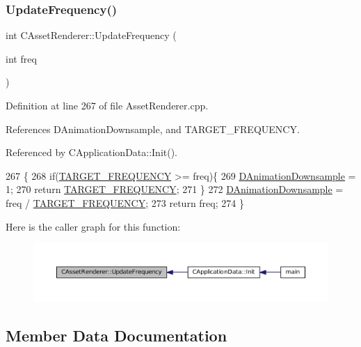 \subsubsection{\texorpdfstring{Update\+Frequency()}{UpdateFrequency()}}
{\footnotesize\ttfamily int C\+Asset\+Renderer\+::\+Update\+Frequency (\begin{DoxyParamCaption}\item[{int}]{freq }\end{DoxyParamCaption})\hspace{0.3cm}{\ttfamily [static]}}



Definition at line 267 of file Asset\+Renderer.\+cpp.



References D\+Animation\+Downsample, and T\+A\+R\+G\+E\+T\+\_\+\+F\+R\+E\+Q\+U\+E\+N\+CY.



Referenced by C\+Application\+Data\+::\+Init().


\begin{DoxyCode}
267                                            \{
268     \textcolor{keywordflow}{if}(\hyperlink{AssetRenderer_8cpp_a0d86e657ae1200c5ec796a3f31e36d49}{TARGET\_FREQUENCY} >= freq)\{
269         \hyperlink{classCAssetRenderer_a13ea9a19837c39e57db499f53366c5b8}{DAnimationDownsample} = 1;
270         \textcolor{keywordflow}{return} \hyperlink{AssetRenderer_8cpp_a0d86e657ae1200c5ec796a3f31e36d49}{TARGET\_FREQUENCY};   
271     \}
272     \hyperlink{classCAssetRenderer_a13ea9a19837c39e57db499f53366c5b8}{DAnimationDownsample} = freq / \hyperlink{AssetRenderer_8cpp_a0d86e657ae1200c5ec796a3f31e36d49}{TARGET\_FREQUENCY};
273     \textcolor{keywordflow}{return} freq;
274 \}
\end{DoxyCode}
Here is the caller graph for this function\+:\nopagebreak
\begin{figure}[H]
\begin{center}
\leavevmode
\includegraphics[width=350pt]{classCAssetRenderer_a06e45891dcbc0a88570c537a4d6906c8_icgraph}
\end{center}
\end{figure}


\subsection{Member Data Documentation}
\hypertarget{classCAssetRenderer_a13ea9a19837c39e57db499f53366c5b8}{}\label{classCAssetRenderer_a13ea9a19837c39e57db499f53366c5b8} 

